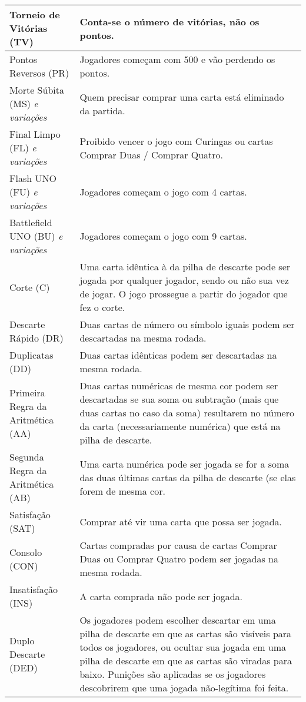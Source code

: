 \begin{center}
\begin{longtable}{|p{4cm}|p{6.5cm}|}
\hline
Torneio de Vitórias (TV) & Conta-se o número de vitórias, não os pontos. \\ \hline
Pontos Reversos (PR) & Jogadores começam com 500 e vão perdendo os pontos. \\ \hline
Morte Súbita (MS) \emph{e variações} & Quem precisar comprar uma carta está eliminado da partida. \\ \hline
Final Limpo (FL) \emph{e variações} & Proibido vencer o jogo com Curingas ou cartas Comprar Duas / Comprar Quatro. \\ \hline
Flash UNO (FU) \emph{e variações} & Jogadores começam o jogo com 4 cartas. \\ \hline
Battlefield UNO (BU) \emph{e variações} & Jogadores começam o jogo com 9 cartas. \\ \hline
Corte (C) & Uma carta idêntica à da pilha de descarte pode ser jogada por qualquer jogador, sendo ou não sua vez de jogar. O jogo prossegue a partir do jogador que fez o corte. \\ \hline
Descarte Rápido (DR) & Duas cartas de número ou símbolo iguais podem ser descartadas na mesma rodada. \\ \hline
Duplicatas (DD) & Duas cartas idênticas podem ser descartadas na mesma rodada. \\ \hline
Primeira Regra da Aritmética (AA) & Duas cartas numéricas de mesma cor podem ser descartadas se sua soma ou subtração (mais que duas cartas no caso da soma) resultarem no número da carta  (necessariamente numérica) que está na pilha de descarte. \\ \hline
Segunda Regra da Aritmética (AB) & Uma carta numérica pode ser jogada se for a soma das duas últimas cartas da pilha de descarte (se elas forem de mesma cor. \\ \hline
Satisfação (SAT) & Comprar até vir uma carta que possa ser jogada. \\ \hline
Consolo (CON) & Cartas compradas por causa de cartas Comprar Duas ou Comprar Quatro podem ser jogadas na mesma rodada. \\ \hline
Insatisfação (INS) & A carta comprada não pode ser jogada. \\ \hline
Duplo Descarte (DED) & Os jogadores podem escolher descartar em uma pilha de descarte em que as cartas são visíveis para todos os jogadores, ou ocultar sua jogada em uma pilha de descarte em que as cartas são viradas para baixo. Punições são aplicadas se os jogadores descobrirem que uma jogada não-legítima foi feita. \\ \hline

\end{longtable}
\end{center}
